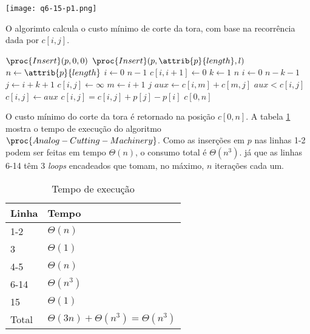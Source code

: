 \begin{center}
\texttt{[image: q6-15-p1.png]}
\label{fig:6.15-1}
\end{center}

O algorimto  calcula o custo mínimo de corte da tora, com base na recorrência dada por $c[i, j]$.

\begin{codebox}
\li $\proc{Insert}(p, 0, 0)$
\li $\proc{Insert}(p, \attrib{p}{length}, l)$
\li $n \gets \attrib{p}{length}$
\li \For $i \gets 0$ \To $n-1$
\li \Do
        $c[i, i+1] \gets 0$
    \End
\li \For $k \gets 1$ \To $n$
\li \Do
        \For $i \gets 0$ \To $n - k - 1$
\li     \Do
            $j \gets i + k + 1$
\li         $c[i, j] \gets \infty$
\li         \For $m \gets i+1$ \To $j$
\li         \Do
                $aux \gets c[i, m] + c[m, j]$
\li             \If $aux < c[i, j]$
\li             \Then
                    $c[i, j] \gets aux$
                \End
            \End
\li         $c[i, j] = c[i, j] + p[j] - p[i]$
        \End 
    \End
\li \Return $c[0, n]$
\end{codebox}

O custo mínimo do corte da tora é retornado na posição $c[0, n]$. A tabela \ref{tbl:6-15-1} mostra o tempo de execução do algoritmo $\proc{Analog-Cutting-Machinery}$. Como as inserções em $p$ nas linhas 1-2 podem ser feitas em tempo $\Theta(n)$, o consumo total é $\Theta(n^3)$. já que as linhas 6-14 têm 3 \textit{loops} encadeados que tomam, no máximo, $n$ iterações cada um.

\begin{table}[H]
\centering
\begin{tabular}{|l|l|}
\hline
Linha                   & Tempo \\ \hline
1-2 & $\Theta(n)$ \\ \hline
3 & $\Theta(1)$ \\ \hline
4-5 & $\Theta(n)$ \\ \hline
6-14 & $\Theta(n^3)$ \\ \hline
15 & $\Theta(1)$ \\ \hline
Total & $\Theta(3n) + \Theta(n^3) = \Theta(n^3)$ \\ \hline
\end{tabular}
\caption{Tempo de execução}
\label{tbl:6-15-1}
\end{table}